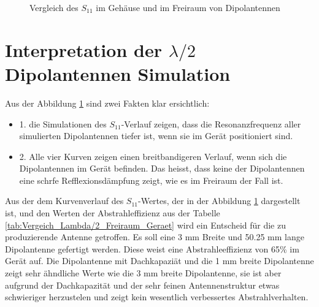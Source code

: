 \begin{figure}[!ht]
	\centering
	\begingroup
	
	\endgroup
	\caption{Vergleich des $S_{11}$ im Gehäuse und im Freiraum von Dipolantennen }	
	\label{S11_Vergleich_Simulation_Dipolantenn_freiraum_Geraet}
\end{figure}


\newpage
\section{Interpretation der $\lambda/2$ Dipolantennen Simulation}
\label{sec:Interpretation_Dipol}

Aus der Abbildung \ref{S11_Vergleich_Simulation_Dipolantenn_freiraum_Geraet} sind zwei Fakten klar ersichtlich: 
\begin{itemize}
\item 1. die Simulationen des $S_{11}$-Verlauf zeigen, dass die Resonanzfrequenz aller simulierten Dipolantennen tiefer ist, wenn sie im Gerät positioniert sind.
\item 2. Alle vier Kurven zeigen einen breitbandigeren Verlauf, wenn sich die Dipolantennen im Gerät befinden. Das heisst, dass keine der Dipolantennen  eine schrfe Refflexionsdämpfung zeigt, wie es im Freiraum der Fall ist. 
\end{itemize}
Aus der dem Kurvenverlauf des $S_{11}$-Wertes, der in der Abbildung \ref{S11_Vergleich_Simulation_Dipolantenn_freiraum_Geraet} dargestellt ist, und den Werten der Abstrahleffizienz aus der Tabelle \ref{tab:Vergeich_Lambda/2_Freiraum_Geraet} wird ein Entscheid für die zu produzierende Antenne getroffen. Es soll eine 3 mm Breite und 50.25 mm lange Dipolantenne gefertigt werden. Diese weist eine Abstrahleeffizienz von 65$\%$ im Gerät auf. Die Dipolantenne mit Dachkapaziät und die 1 mm breite Dipolantenne zeigt sehr ähndliche Werte wie die 3 mm breite Dipolantenne, sie ist aber aufgrund der Dachkapazität und der sehr feinen Antennenstruktur etwas schwieriger herzustelen und zeigt kein wesentlich verbessertes Abstrahlverhalten.
